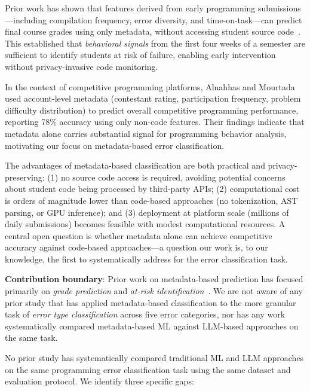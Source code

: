 \documentclass[acmsmall]{acmart}
\begin{document}
Prior work has shown that features derived from early
programming submissions---including compilation frequency, error diversity,
and time-on-task---can predict final course grades using only metadata,
without accessing student source code~\cite{jadud2006methods,brown2014blackbox}. This established that
\textit{behavioral signals} from the first four weeks of a semester
are sufficient to identify students at risk of failure, enabling early
intervention without privacy-invasive code monitoring.

In the context of competitive programming platforms, Alnahhas and
Mourtada~\cite{alnahhas2020predicting} used account-level metadata (contestant
rating, participation frequency, problem difficulty distribution) to predict
overall competitive programming performance, reporting 78\% accuracy using
only non-code features. Their findings indicate that metadata alone carries
substantial signal for programming behavior analysis, motivating our focus on
metadata-based error classification.

The advantages of metadata-based classification are both practical and
privacy-preserving: (1) no source code access is required, avoiding
potential concerns about student code being processed by third-party APIs;
(2) computational cost is orders of magnitude lower than code-based
approaches (no tokenization, AST parsing, or GPU inference); and
(3) deployment at platform scale (millions of daily submissions) becomes
feasible with modest computational resources. A central open question
is whether metadata alone can achieve competitive accuracy against
code-based approaches---a question our work is, to our knowledge, the first to
systematically
address for the error classification task.

\noindent\textbf{Contribution boundary}: Prior work on metadata-based prediction
has focused primarily on \textit{grade prediction} and \textit{at-risk
identification}~\cite{pears2007survey}. We are not aware of
any prior study that has applied metadata-based classification to the more
granular task of \textit{error type classification} across five error
categories, nor has any work systematically compared metadata-based ML against
LLM-based approaches on the same task.

No prior study has systematically compared traditional ML and
LLM approaches on the same programming error classification task using the
same dataset and evaluation protocol. We identify three specific gaps:
\end{document}
